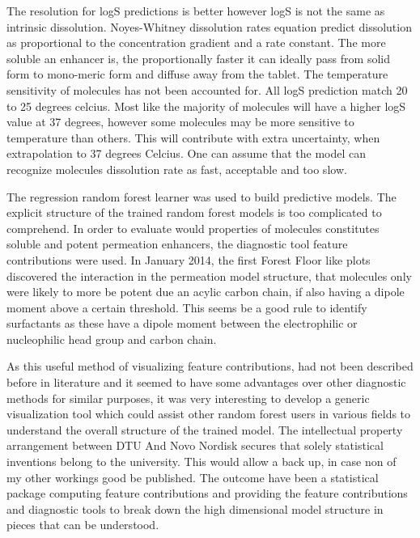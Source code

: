 The resolution for logS predictions is better however logS is not the same as intrinsic dissolution. Noyes-Whitney dissolution rates equation predict dissolution as proportional to the concentration gradient and a rate constant. The more soluble an enhancer is, the proportionally faster it can ideally pass from solid form to mono-meric form and diffuse away from the tablet. The temperature sensitivity of molecules has not been accounted for. All logS prediction match 20 to 25 degrees celcius. Most like the majority of molecules will have a higher logS value at 37 degrees, however some molecules may be more sensitive to temperature than others. This will contribute with extra uncertainty, when extrapolation to 37 degrees Celcius. One can assume that the model can recognize molecules dissolution rate as fast, acceptable and too slow.

The regression random forest learner was used to build predictive models. The explicit structure of the trained random forest models is too complicated to comprehend. In order to evaluate would properties of molecules constitutes soluble and potent permeation enhancers, the diagnostic tool feature contributions were used. In January 2014, the first Forest Floor like plots discovered the interaction in the permeation model structure, that molecules only were likely to more be potent due an acylic carbon chain, if also having a dipole moment above a certain threshold. This seems be a good rule to identify surfactants as these have a dipole moment between the electrophilic or nucleophilic head group and carbon chain.

As this useful method of visualizing feature contributions, had not been described before in literature and it seemed to have some advantages over other diagnostic methods for similar purposes, it was very interesting to develop a generic visualization tool which could assist other random forest users in various fields to understand the overall structure of the trained model. The intellectual property arrangement between DTU And Novo Nordisk secures that solely statistical inventions belong to the university. This would allow a back up, in case non of my other workings good be published. The outcome have been a statistical package computing feature contributions and providing the feature contributions and diagnostic tools to break down the high dimensional model structure in pieces that can be understood.
